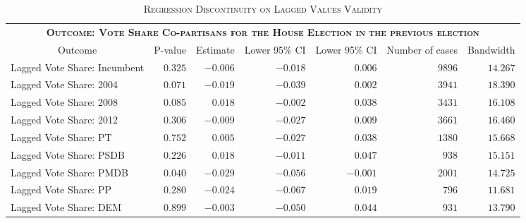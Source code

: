 \begin{table}[!tbp]
\caption{\textsc{Regression Discontinuity on Lagged Values Validity}\label{}} 
\begin{tabular}{lrrrrrr}
\toprule
\multicolumn{7}{c}{\bfseries \bfseries{\textsc{Outcome: Vote Share Co-partisans for the House Election in the previous election}}}\tabularnewline
\cline{1-7}
\multicolumn{1}{c}{Outcome}&\multicolumn{1}{c}{P-value}&\multicolumn{1}{c}{Estimate}&\multicolumn{1}{c}{Lower 95\% CI}&\multicolumn{1}{c}{Lower 95\% CI}&\multicolumn{1}{c}{Number of cases}&\multicolumn{1}{c}{Bandwidth}\tabularnewline
\midrule
Lagged Vote Share: Incumbent&$0.325$&$-0.006$&$-0.018$&$ 0.006$&$9896$&$14.267$\tabularnewline
Lagged Vote Share: 2004&$0.071$&$-0.019$&$-0.039$&$ 0.002$&$3941$&$18.390$\tabularnewline
Lagged Vote Share: 2008&$0.085$&$ 0.018$&$-0.002$&$ 0.038$&$3431$&$16.108$\tabularnewline
Lagged Vote Share: 2012&$0.306$&$-0.009$&$-0.027$&$ 0.009$&$3661$&$16.460$\tabularnewline
Lagged Vote Share: PT&$0.752$&$ 0.005$&$-0.027$&$ 0.038$&$1380$&$15.668$\tabularnewline
Lagged Vote Share: PSDB&$0.226$&$ 0.018$&$-0.011$&$ 0.047$&$ 938$&$15.151$\tabularnewline
Lagged Vote Share: PMDB&$0.040$&$-0.029$&$-0.056$&$-0.001$&$2001$&$14.725$\tabularnewline
Lagged Vote Share: PP&$0.280$&$-0.024$&$-0.067$&$ 0.019$&$ 796$&$11.681$\tabularnewline
Lagged Vote Share: DEM&$0.899$&$-0.003$&$-0.050$&$ 0.044$&$ 931$&$13.790$\tabularnewline
\bottomrule
\end{tabular}
\end{table}
